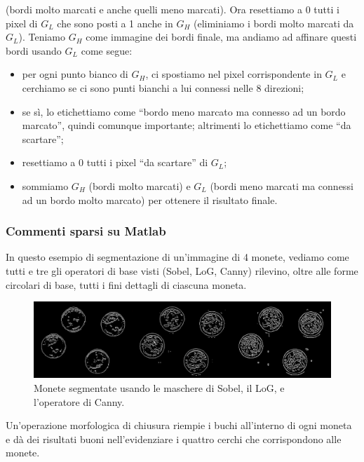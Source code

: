 \documentclass[a4paper,11pt]{article}
\begin{document}
(bordi molto marcati e anche quelli meno marcati). Ora resettiamo a 0 tutti i pixel di $G_L$ che sono posti a 1 anche in $G_H$ (eliminiamo i bordi molto marcati
da $G_L$). Teniamo $G_H$ come immagine dei bordi finale, ma andiamo ad affinare questi bordi usando $G_L$ come segue:
\begin{itemize}
    \item per ogni punto bianco di $G_H$, ci spostiamo nel pixel corrispondente in $G_L$ e cerchiamo se ci sono punti bianchi a lui connessi nelle 8 direzioni;
    \item se sì, lo etichettiamo come ``bordo meno marcato ma connesso ad un bordo marcato'', quindi comunque importante; altrimenti lo etichettiamo come ``da
    scartare'';
    \item resettiamo a 0 tutti i pixel ``da scartare'' di $G_L$;
    \item sommiamo $G_H$ (bordi molto marcati) e $G_L$ (bordi meno marcati ma connessi ad un bordo molto marcato) per ottenere il risultato finale.
\end{itemize}

\subsubsection{Commenti sparsi su Matlab}
In questo esempio di segmentazione di un'immagine di 4 monete, vediamo come tutti e tre gli operatori di base visti (Sobel, LoG, Canny) rilevino, oltre alle
forme circolari di base, tutti i fini dettagli di ciascuna moneta.

\renewcommand{\thefigure}{10.1}
\begin{figure}[!h]
  \centering
    \includegraphics[scale=0.4]{images/10/coins_sobel_log_canny.png}
    \caption{Monete segmentate usando le maschere di Sobel, il LoG, e l'operatore di Canny.}
\end{figure}

Un'operazione morfologica di chiusura riempie i buchi all'interno di ogni moneta
e dà dei risultati buoni nell'evidenziare i quattro cerchi che corrispondono alle monete.
\end{document}
